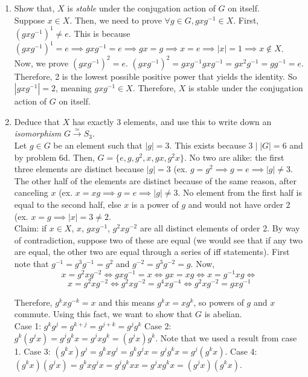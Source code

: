 \documentclass{amsart}
\begin{document}
\begin{enumerate}
\begin{enumerate}
	\item Show that, $X$ is \emph{stable} under the conjugation action of $G$ on itself.\\

    Suppose $x\in X$. Then, we need to prove $\forall g\in G,gxg^{-1}\in X$. 
    First, $(gxg^{-1})^1\neq e$. This is because $(gxg^{-1})^1=e\implies gxg^{-1}=e\implies gx=g\implies x=e\implies |x|=1\implies x\notin X$. Now, we prove $(gxg^{-1})^2=e.$ $(gxg^{-1})^2=gxg^{-1}gxg^{-1}=gx^2g^{-1}=gg^{-1}=e$.\\
    
    Therefore, 2 is the lowest possible positive power that yields the identity. So $|gxg^{-1}|=2$, meaning $gxg^{-1}\in X$. Therefore, $X$ is stable under the conjugation action of $G$ on itself.
    
	\item Deduce that $X$ has exactly $3$ elements, and use this to write down an \emph{isomorphism} $G\xrightarrow{\simeq}S_3$.\\

    Let $g\in G$ be an element such that $|g|=3$. This exists because $3\mid |G|=6$ and by problem 6d. Then, $G=\{e,g,g^2,x,gx,g^2x\}$. No two are alike: the first three elements are distinct because $|g|=3$ (ex. $g=g^2\implies g=e\implies |g|\neq 3$. The other half of the elements are distinct because of the same reason, after canceling $x$ (ex. $x=xg\implies g=e\implies |g|\neq 3$. No element from the first half is equal to the second half, else $x$ is a power of $g$ and would not have order 2 (ex. $x=g\implies |x|=3\neq2$.\\
    
    Claim: if $x\in X$, $x$, $gxg^{-1}$, $g^2xg^{-2}$ are all distinct elements of order 2. By way of contradiction, suppose two of these are equal (we would see that if any two are equal, the other two are equal through a series of iff statements). First note that $g^{-1}=g^3g^{-1}=g^2$ and $g^{-2}=g^3g^{-2}=g$. Now, $$x=g^2xg^{-2}\iff gxg^{-1}=x\iff gx=xg\iff x=g^{-1}xg\iff$$ $$ x=g^2xg^{-2}\iff g^2xg^{-2}=g^4xg^{-4}\iff g^2xg^{-2}=gxg^{-1}$$

    Therefore, $g^kxg^{-k}=x$ and this means $g^kx=xg^k$, so powers of $g$ and $x$ commute. Using this fact, we want to show that $G$ is abelian.\\
    
    Case 1: $g^kg^j=g^{k+j}=g^{j+k}=g^jg^k$ 
    Case 2: $g^k(g^jx)=g^jg^kx=g^jxg^k=(g^jx)g^k$. Note that we used a result from case 1.
    Case 3: $(g^{k}x)g^j=g^kxg^j=g^kg^jx=g^jg^kx=g^j(g^kx)$.
    Case 4: $(g^{k}x)(g^jx)=g^kxg^jx=g^jg^kxx=g^jxg^kx=(g^jx)(g^kx)$.\\


\end{enumerate}
\end{enumerate}
\end{document}
